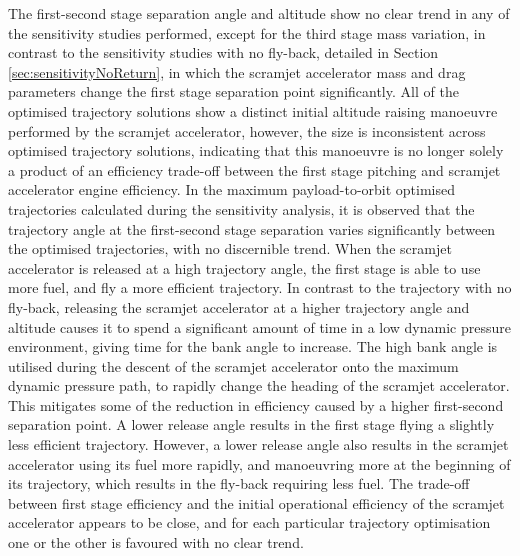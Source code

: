 The first-second stage separation angle and altitude show no clear trend in any of the sensitivity studies performed, except for the third stage mass variation, in contrast to the sensitivity studies with no fly-back, detailed in Section \ref{sec:sensitivityNoReturn}, in which the scramjet accelerator mass and drag parameters change the first stage separation point significantly. All of the optimised trajectory solutions show a distinct initial altitude raising manoeuvre performed by the scramjet accelerator, however, the size is inconsistent across optimised trajectory solutions, indicating that this manoeuvre is no longer solely a product of an efficiency trade-off between the first stage pitching and scramjet accelerator engine efficiency.
In the maximum payload-to-orbit optimised trajectories calculated during the sensitivity analysis, it is observed that the trajectory angle at the first-second stage separation varies significantly between the optimised trajectories, with no discernible trend. When the scramjet accelerator is released at a high trajectory angle, the first stage is able to use more fuel, and fly a more efficient trajectory. In contrast to the trajectory with no fly-back,
releasing the scramjet accelerator at a higher trajectory angle and altitude causes it to spend a significant amount of time in a low dynamic pressure environment, giving time for the bank angle to increase. The high bank angle is utilised during the descent of the scramjet accelerator onto the maximum dynamic pressure path, to rapidly change the heading of the scramjet accelerator. This mitigates some of the reduction in efficiency caused by a higher first-second separation point.
 A lower release angle results in the first stage flying a slightly less efficient trajectory. However, a lower release angle also results in the scramjet accelerator using its fuel more rapidly, and manoeuvring more at the beginning of its trajectory, which results in the fly-back requiring less fuel. 
The trade-off between first stage efficiency and the initial operational efficiency of the scramjet accelerator appears to be close, and 
for each particular trajectory optimisation one or the other is favoured with no clear trend. 


